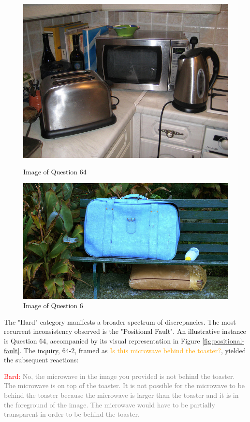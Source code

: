 \documentclass[twocolumn,11pt]{report}
\begin{document}
\begin{figure}[h]
    \centering
    \begin{minipage}{0.5\linewidth}
        \centering
        \includegraphics[width=0.8\linewidth]{../image set/hard/000000256309.jpg}
        \caption{Image of Question 64}
        \label{fig:positional-fault}
    \end{minipage}%
    \begin{minipage}{0.5\linewidth}
      \centering
      \includegraphics[width=0.8\linewidth]{../image set/easy/000000037024.jpg}
      \caption{Image of Question 6}
      \label{fig:vertical-fault}
    \end{minipage}
\end{figure}

The "Hard" category manifests a broader spectrum of discrepancies. The most recurrent inconsistency observed is the "Positional Fault". An illustrative instance is Question 64, accompanied by its visual representation in Figure \ref{fig:positional-fault}. The inquiry, 64-2, framed as \textcolor{orange}{Is this microwave behind the toaster?}, yielded the subsequent reactions:

\textcolor{red}{Bard:} \textcolor{gray}{No, the microwave in the image you provided is not behind the toaster. The microwave is on top of the toaster. It is not possible for the microwave to be behind the toaster because the microwave is larger than the toaster and it is in the foreground of the image. The microwave would have to be partially transparent in order to be behind the toaster.}
\end{document}
